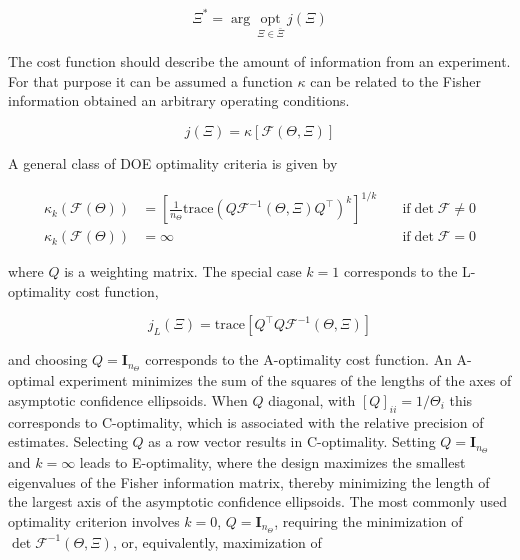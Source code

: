 \documentclass[../Article_Design_of_Experiment.tex]{subfiles}
\begin{document}
	{\footnotesize
	\begin{equation}
		\Xi^* = \arg~\underset{\Xi \in \bar{\Xi}}{\text{opt}}~j\left(\Xi\right)
	\end{equation} }
	
	The cost function should describe the amount of information from an experiment. For that purpose it can be assumed a function $\kappa$ can be related to the Fisher information obtained an arbitrary operating conditions.
	
	{\footnotesize
	\begin{equation}
		j(\Xi) = \kappa\left[ \mathcal{F}(\Theta, \Xi) \right]
	\end{equation} }
	
	
	A general class of DOE optimality criteria is given by
	
	{\footnotesize
	\begin{align}
		\kappa_k(\mathcal{F}(\Theta)) &= \left[\frac{1}{n_\Theta} \text{trace}\left( Q\mathcal{F}^{-1}(\Theta, \Xi) Q^\top \right)^k \right]^{1/k} \quad &\text{if} \det \mathcal{F} \neq 0 \nonumber \\
		\kappa_k(\mathcal{F}(\Theta)) &= \infty \quad &\text{if} \det \mathcal{F} = 0
	\end{align} }
	
	where $Q$ is a weighting matrix. The special case $k = 1$ corresponds to the L-optimality cost function,
	
	{\footnotesize
	\begin{equation}
		j_L(\Xi) = \text{trace} \left[ Q^\top Q\mathcal{F}^{-1}(\Theta,\Xi) \right]
	\end{equation} }
	
	and choosing $Q = \textbf{I}_{n_\Theta}$ corresponds to the A-optimality cost function. An A-optimal experiment minimizes the sum of the squares of the lengths of the axes of asymptotic confidence ellipsoids. When $Q$ diagonal, with $[Q]_{ii} = 1/\Theta_i$ this corresponds to C-optimality, which is associated with the relative precision of estimates. Selecting $Q$ as a row vector results in C-optimality. Setting $Q = \textbf{I}_{n_\Theta}$ and $k = \infty$ leads to E-optimality, where the design maximizes the smallest eigenvalues of the Fisher information matrix, thereby minimizing the length of the largest axis of the asymptotic confidence ellipsoids. The most commonly used optimality criterion involves $k = 0$, $Q = \textbf{I}_{n_\Theta}$, requiring the minimization of $\det \mathcal{F}^{-1}(\Theta, \Xi)$, or, equivalently, maximization of
	
\end{document}
